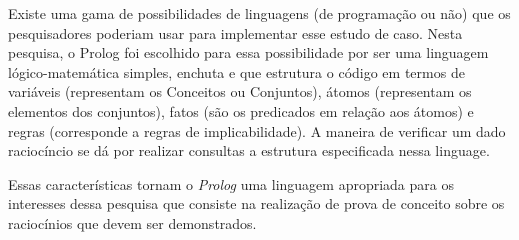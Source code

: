 Existe uma gama de possibilidades de linguagens (de programação ou não) que os pesquisadores poderiam usar para implementar esse estudo de caso. Nesta pesquisa, o Prolog foi escolhido para essa possibilidade por ser uma linguagem lógico-matemática simples, enchuta e que estrutura o código em termos de variáveis (representam os Conceitos ou Conjuntos), átomos (representam os elementos dos conjuntos),  fatos (são os predicados em relação aos átomos) e regras (corresponde a regras de implicabilidade). A maneira de verificar um dado raciocíncio se dá por realizar consultas a estrutura especificada nessa linguage. 

Essas características tornam o \textit{Prolog} uma linguagem apropriada para os interesses dessa pesquisa que consiste na realização de prova de conceito sobre os raciocínios que devem ser demonstrados. 